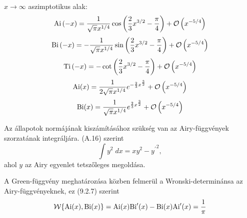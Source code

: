$x \to \infty$ aszimptotikus alak:
\begin{equation}
	\mathrm{Ai}\left(-x\right) = \frac{1}{\sqrt{\pi}x^{1/4}}\cos\left(\frac{2}{3}x^{3/2} - \frac{\pi}{4}\right) + \mathcal{O}\left(x^{-5/4}\right)
\end{equation}
\begin{equation}
	\mathrm{Bi}\left(-x\right) = -\frac{1}{\sqrt{\pi}x^{1/4}}\sin\left(\frac{2}{3}x^{3/2} - \frac{\pi}{4}\right) + \mathcal{O}\left(x^{-5/4}\right)
\end{equation}
\begin{equation}
	\mathrm{Ti}\left(-x\right) = -\cot\left( \frac{2}{3}x^{3/2} - \frac{\pi}{4} \right) + \mathcal{O}\left(x^{-5/4}\right)
\end{equation}
\begin{equation}
	\mathrm{Ai}(x) = \frac{1}{2\sqrt{\pi}x^{1/4}}e^{-\frac{2}{3}x^{\frac{3}{2}}}+\mathcal{O}\left(x^{-5/4}\right)
\end{equation}
\begin{equation}
	\mathrm{Bi}(x) = \frac{1}{ \sqrt{\pi}x^{1/4}}e^{ \frac{2}{3}x^{\frac{3}{2}}}+\mathcal{O}\left(x^{-5/4}\right)
\end{equation}

Az állapotok normájának kiszámításához szükség van az Airy-függvények szorzatának integráljára. \cite{Albright_1977} (A.16) szerint
\begin{equation}
	\int y^2\;dx = xy^2 - {y^\prime}^2,
	\label{airy:normintegral}
\end{equation}
ahol $y$ az Airy egyenlet tetszőleges megoldása.

A Green-függvény meghatározása közben felmerül a Wronski-determinánsa az Airy-függvényeknek, ez \cite{NIST:DLMF} (9.2.7) szerint
\begin{equation}
	\mathcal{W} \{ \mathrm{Ai}(x), \mathrm{Bi}(x) \} = \mathrm{Ai}(x)\mathrm{Bi}^\prime(x) - \mathrm{Bi}(x)\mathrm{Ai}^\prime(x) = \frac{1}{\pi}
\end{equation}








